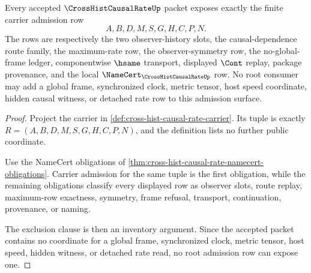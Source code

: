 \begin{theorem}
\label{thm:cross-hist-causal-rate-obligation-carrier-admission}
Every accepted $\CrossHistCausalRateUp$ packet exposes exactly the finite carrier admission row
$$
A,B,D,M,S,G,H,C,P,N.
$$
The rows are respectively the two observer-history slots, the causal-dependence route family, the maximum-rate row, the observer-symmetry row, the no-global-frame ledger, componentwise $\hsame$ transport, displayed $\Cont$ replay, package provenance, and the local $\NameCert_{\CrossHistCausalRateUp}$ row. No root consumer may add a global frame, synchronized clock, metric tensor, host speed coordinate, hidden causal witness, or detached rate row to this admission surface.
\end{theorem}
\begin{proof}
Project the carrier in \autoref{def:cross-hist-causal-rate-carrier}. Its tuple is exactly $R=(A,B,D,M,S,G,H,C,P,N)$, and the definition lists no further public coordinate.

Use the NameCert obligations of \autoref{thm:cross-hist-causal-rate-namecert-obligations}. Carrier admission for the same tuple is the first obligation, while the remaining obligations classify every displayed row as observer slots, route replay, maximum-row exactness, symmetry, frame refusal, transport, continuation, provenance, or naming.

The exclusion clause is then an inventory argument. Since the accepted packet contains no coordinate for a global frame, synchronized clock, metric tensor, host speed, hidden witness, or detached rate read, no root admission row can expose one.
\end{proof}

